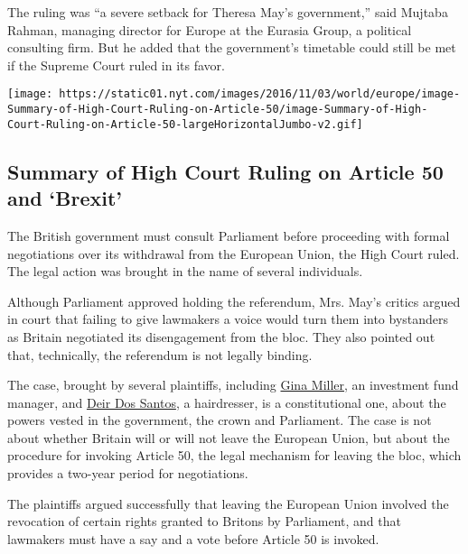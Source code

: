 The ruling was ``a severe setback for Theresa May's government,'' said
Mujtaba Rahman, managing director for Europe at the Eurasia Group, a
political consulting firm. But he added that the government's timetable
could still be met if the Supreme Court ruled in its favor.

\href{https://www.nytimes.com/interactive/2016/11/03/world/europe/article-50-high-court-ruling.html}{}

\texttt{[image: https://static01.nyt.com/images/2016/11/03/world/europe/image-Summary-of-High-Court-Ruling-on-Article-50/image-Summary-of-High-Court-Ruling-on-Article-50-largeHorizontalJumbo-v2.gif]}

\hypertarget{summary-of-high-court-ruling-on-article-50-and-brexit}{%
\subsection{Summary of High Court Ruling on Article 50 and
`Brexit'}\label{summary-of-high-court-ruling-on-article-50-and-brexit}}

The British government must consult Parliament before proceeding with
formal negotiations over its withdrawal from the European Union, the
High Court ruled. The legal action was brought in the name of several
individuals.

Although Parliament approved holding the referendum, Mrs. May's critics
argued in court that failing to give lawmakers a voice would turn them
into bystanders as Britain negotiated its disengagement from the bloc.
They also pointed out that, technically, the referendum is not legally
binding.

The case, brought by several plaintiffs, including
\href{http://www.telegraph.co.uk/news/2016/10/13/who-is-gina-miller-the-woman-leading-the-brexit-legal-battle/}{Gina
Miller}, an investment fund manager, and
\href{http://www.independent.co.uk/news/uk/home-news/brexit-legal-challenge-deir-dos-santos-speech-high-court-david-greene-theresa-may-plans-voting-to-a7395096.html}{Deir
Dos Santos}, a hairdresser, is a constitutional one, about the powers
vested in the government, the crown and Parliament. The case is not
about whether Britain will or will not leave the European Union, but
about the procedure for invoking Article 50, the legal mechanism for
leaving the bloc, which provides a two-year period for negotiations.

The plaintiffs argued successfully that leaving the European Union
involved the revocation of certain rights granted to Britons by
Parliament, and that lawmakers must have a say and a vote before Article
50 is invoked.

